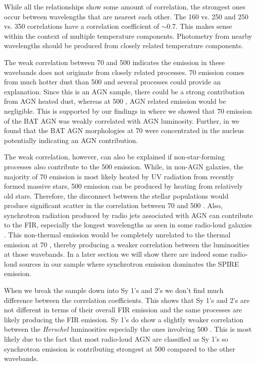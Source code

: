 While all the relationships show some amount of correlation, the strongest ones occur between wavelengths that are nearest each other. The 160 vs. 250 \um{} and 250 vs. 350 \um{} correlations have a correlation coefficient of $\sim0.7$. This makes sense within the context of multiple temperature components. Photometry from nearby wavelengths should be produced from closely related temperature components.

The weak correlation between 70 and 500 \um{} indicates the emission in these wavebands does not originate from closely related processes. 70 \um{} emission comes from much hotter dust than 500 \um{} and several processes could provide an explanation. Since this is an AGN sample, there could be a strong contribution from AGN heated dust, whereas at 500 \um{}, AGN related emission would be negligible. This is supported by our findings in \citet{Melendez:2014yu} where we showed that 70 \um{} emission of the BAT AGN was weakly correlated with AGN luminosity. Further, in \citep{Mushotzky:2014ad} we found that the BAT AGN morphologies at 70 \um{} were concentrated in the nucleus potentially indicating an AGN contribution.

The weak correlation, however, can also be explained if non-star-forming processes also contribute to the 500 \um{} emission. While, in non-AGN galaxies, the majority of 70 \um{} emission is most likely heated by UV radiation from recently formed massive stars, 500 \um{} emission can be produced by heating from relatively old stars. Therefore, the disconnect between the stellar populations would produce significant scatter in the correlation between 70 and 500 \um. Also, synchrotron radiation produced by radio jets associated with AGN can contribute to the FIR, especially the longest wavelengths as seen in some radio-loud galaxies \citep{Baes:2010ek,Boselli:2010fr}. This non-thermal emission would be completely unrelated to the thermal emission at 70 \um, thereby producing a weaker correlation between the luminosities at those wavebands. In a later section we will show there are indeed some radio-loud sources in our sample where synchrotron emission dominates the SPIRE emission. 

When we break the sample down into Sy 1's and 2's we don't find much difference between the correlation coefficients. This shows that Sy 1's and 2's are not different in terms of their overall FIR emission and the same processes are likely producing the FIR emission. Sy 1's do show a slightly weaker correlation between the \textit{Herschel} luminosities especially the ones involving 500 \um. This is most likely due to the fact that most radio-loud AGN are classified as Sy 1's so synchrotron emission is contributing strongest at 500 \um compared to the other wavebands.